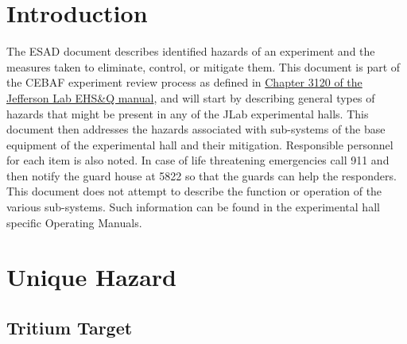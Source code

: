 
%
%
%

\chapter{Introduction}

The ESAD document describes identified hazards of an experiment and the measures taken to eliminate, control, or mitigate them.
This document is part of the CEBAF experiment review process as defined in
\href{http://www.jlab.org/ehs/ehsmanual/manual/3120.html}{Chapter 3120 of the Jefferson Lab EHS\&Q manual},
and will start by describing general types of hazards that might be present in any of the  
JLab experimental halls.  This document then addresses the hazards associated 
with sub-systems of the base equipment of the experimental hall and their 
mitigation.  Responsible personnel for each item is also noted.  
In case of life threatening 
emergencies call 911 and then notify the guard house at 5822 so that the guards can help
the responders.  This document does not attempt to describe the function 
or operation of the various sub-systems. Such information can be found in
the experimental hall specific Operating Manuals.

\chapter{Unique Hazard}

\section{Tritium Target}

